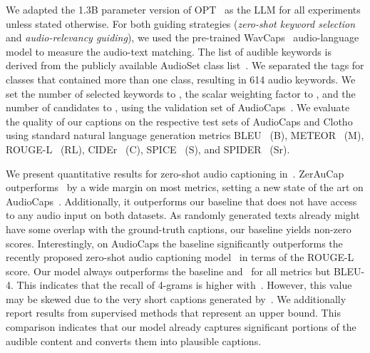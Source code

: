 \documentclass{article}
\newcommand{\modelName}{ZerAuCap\xspace}
\newcommand{\mypara}[1]{\vspace{2pt}\noindent{\bf{#1}}}
\begin{document}
\mypara{Experimental setup.}
We adapted the 1.3B parameter version of OPT~\cite{zhang2022opt} as the LLM for all experiments unless stated otherwise. For both guiding strategies (\emph{zero-shot keyword selection} and \emph{audio-relevancy guiding}), we used the pre-trained WavCaps~\cite{Mei2023WavCapsAC} audio-language model to measure the audio-text matching.
The list of audible keywords is derived from the publicly available AudioSet class list~\cite{Gemmeke2017AudioSA}. We separated the tags for classes that contained more than one class, resulting in 614 audio keywords.
We set the number of selected keywords to , the scalar weighting factor to , and the number of candidates to , using the validation set of AudioCaps~\cite{kim2019audiocaps}.
We evaluate the quality of our captions on the respective test sets of AudioCaps and Clotho~\cite{drossos2020clotho} using standard natural language generation metrics BLEU~\cite{papineni2001BLEUMethodAutomatic} (B), METEOR~\cite{banerjee2005METEORAutomaticMetric} (M), ROUGE-L~\cite{lin2004ROUGEPackageAutomatic} (RL), CIDEr~\cite{vedantam2015CIDErConsensusbased} (C), SPICE~\cite{anderson2016spice} (S), and SPIDER~\cite{liu2017spider} (Sr).




\mypara{Quantitative results.}
We present quantitative results for zero-shot audio captioning in~. \modelName outperforms~\cite{shaharabany2023zero} by a wide margin on most metrics, setting a new state of the art on AudioCaps~\cite{kim2019audiocaps}.
Additionally, it outperforms our baseline that does not have access to any audio input on both datasets. As randomly generated texts already might have some overlap with the ground-truth captions, our baseline yields non-zero scores. Interestingly, on AudioCaps the baseline significantly outperforms the recently proposed zero-shot audio captioning model~\cite{shaharabany2023zero} in terms of the ROUGE-L score.
Our model always outperforms the baseline and~\cite{shaharabany2023zero} for all metrics but BLEU-4\@. This indicates that the recall of 4-grams is higher with~\cite{shaharabany2023zero}. However, this value may be skewed due to the very short captions generated by~\cite{shaharabany2023zero}.
We additionally report results from supervised methods that represent an upper bound. This comparison indicates that our model already captures significant portions of the audible content and converts them into plausible captions.
\end{document}
